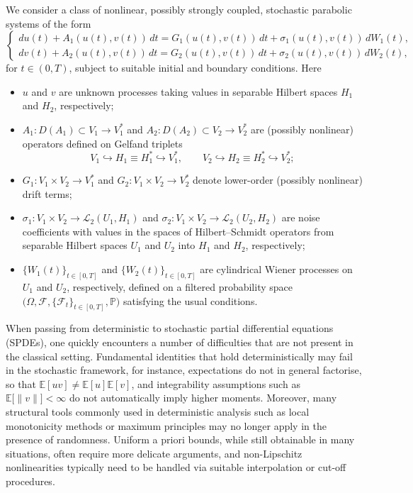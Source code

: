\documentclass[english,a4paper,11pt]{amsart}
\theoremstyle{plain}
\theoremstyle{definition}
\theoremstyle{remark}
\numberwithin{equation}{section}
\begin{document}
	We consider a class of nonlinear, possibly strongly coupled, stochastic parabolic 
	systems of the form
	\begin{equation}\label{e:SPDE}
		\begin{cases}
			du(t) +A_1(u(t),v(t))\,dt 
			= G_1(u(t),v(t))\,dt + \sigma_1(u(t),v(t))\,dW_1(t), \\[6pt]
			dv(t) + A_2(u(t),v(t))\,dt 
			= G_2(u(t),v(t))\,dt + \sigma_2(u(t),v(t))\,dW_2(t),
		\end{cases}
	\end{equation} for $t\in(0,T)$,
	subject to suitable initial and boundary conditions.
	Here
	\begin{itemize}
		\item $u$ and $v$ are unknown processes taking values in separable Hilbert spaces 
		$H_1$ and $H_2$, respectively;
		\item $A_1:D(A_1)\subset V_1 \to V_1^\ast$ and 
		$A_2:D(A_2)\subset V_2 \to V_2^\ast$ are (possibly nonlinear) 
		operators defined on Gelfand triplets
		\[
		V_1 \hookrightarrow H_1 \equiv H_1^\ast \hookrightarrow V_1^\ast,
		\qquad
		V_2 \hookrightarrow H_2 \equiv H_2^\ast \hookrightarrow V_2^\ast;
		\]
		\item $G_1:V_1\times V_2 \to V_1^\ast$ and 
		$G_2:V_1\times V_2 \to V_2^\ast$ denote lower-order (possibly nonlinear) 
		drift terms;
		\item $\sigma_1:V_1\times V_2\to \mathcal{L}_2(U_1,H_1)$ and 
		$\sigma_2:V_1\times V_2 \to \mathcal{L}_2(U_2,H_2)$ are noise coefficients 
		with values in the spaces of Hilbert--Schmidt operators from separable 
		Hilbert spaces $U_1$ and $U_2$ into $H_1$ and $H_2$, respectively;
		\item $\{W_1(t)\}_{t\in[0,T]}$ and $\{W_2(t)\}_{t\in[0,T]}$ are cylindrical Wiener processes 
		on $U_1$ and $U_2$, respectively, defined on a filtered probability space 
		$\big(\Omega,\mathcal{F},\{\mathcal{F}_t\}_{t\in[0,T]},\mathbb{P}\big)$ satisfying the 
		usual conditions.
	\end{itemize}
	
	
	
When passing from deterministic to stochastic partial differential equations (SPDEs), one quickly encounters a number of difficulties that are not present in the 
classical setting. Fundamental identities that hold deterministically may fail in the stochastic framework, for instance, expectations do not in general 
factorise, so that $\mathbb{E}[uv] \neq \mathbb{E}[u]\mathbb{E}[v]$, and 
integrability assumptions such as $\mathbb{E}\big[\|v\|\big] < \infty$ do not automatically 
imply higher moments. Moreover, many structural tools commonly used in 
deterministic analysis such as local monotonicity methods or maximum principles may 
no longer apply in the presence of randomness. Uniform a priori bounds, while 
still obtainable in many situations, often require more delicate arguments, and 
non-Lipschitz nonlinearities typically need to be handled via suitable 
interpolation or cut-off procedures.
\end{document}

